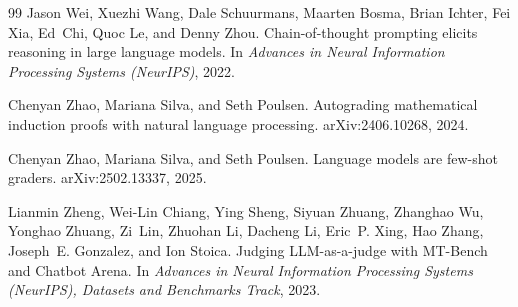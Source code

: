 \documentclass[11pt,a4paper]{article}
\theoremstyle{definition}
\begin{document}
\begin{thebibliography}{99}
Jason Wei, Xuezhi Wang, Dale Schuurmans, Maarten Bosma, Brian Ichter, Fei Xia, Ed~Chi, Quoc Le, and Denny Zhou.
\newblock Chain-of-thought prompting elicits reasoning in large language models.
\newblock In \emph{Advances in Neural Information Processing Systems (NeurIPS)}, 2022.

Chenyan Zhao, Mariana Silva, and Seth Poulsen.
\newblock Autograding mathematical induction proofs with natural language processing.
\newblock arXiv:2406.10268, 2024.

Chenyan Zhao, Mariana Silva, and Seth Poulsen.
\newblock Language models are few-shot graders.
\newblock arXiv:2502.13337, 2025.

Lianmin Zheng, Wei-Lin Chiang, Ying Sheng, Siyuan Zhuang, Zhanghao Wu, Yonghao Zhuang, Zi~Lin, Zhuohan Li, Dacheng Li, Eric~P. Xing, Hao Zhang, Joseph~E. Gonzalez, and Ion Stoica.
\newblock Judging {LLM}-as-a-judge with {MT-Bench} and {Chatbot Arena}.
\newblock In \emph{Advances in Neural Information Processing Systems (NeurIPS), Datasets and Benchmarks Track}, 2023.

\end{thebibliography}

\appendix
\end{document}
